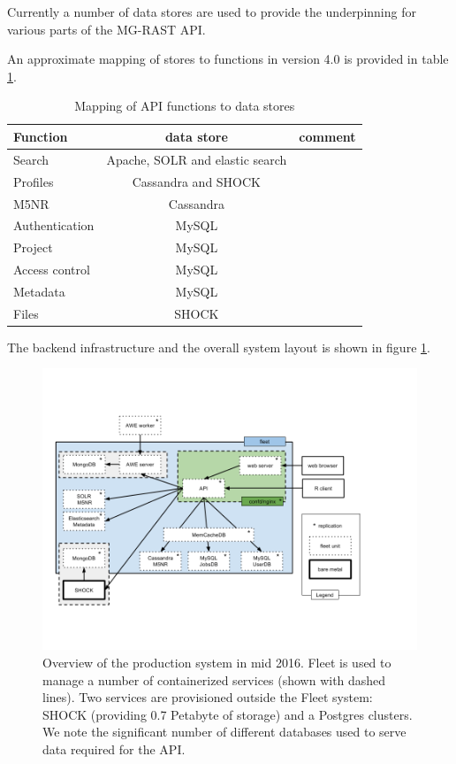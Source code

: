 \documentclass[12pt,fullpage]{report}
\begin{document}
Currently a number of data stores are used to provide the underpinning for various parts of the MG-RAST API.

An approximate mapping of stores to functions in version 4.0 is provided in table \ref{xtab:v4-stores-to-API}.

\begin{table}
\begin{center}
\begin{tabular}{ l | c | c }
Function & data store  & comment\\
  \hline
Search  & Apache, SOLR and elastic search & \\
Profiles & Cassandra and SHOCK & \\
M5NR   & Cassandra & \\
Authentication & MySQL \\
Project             & MySQL  & \\
Access control & MySQL &\\
Metadata         & MySQL & \\
Files                & SHOCK & \\
  \hline
\end{tabular}
\caption{Mapping of API functions to data stores}
\label{xtab:v4-stores-to-API}
\end{center}
\end{table}


The backend infrastructure and the overall system layout is shown in figure \ref{fig:2016-production}.

\begin{figure}
\begin{center}
\includegraphics[width=6in]{Images/2016-production-overview.png}
\end{center}
\caption{
Overview of the production system in mid 2016. Fleet is used to manage a number of containerized services (shown with dashed lines). Two services are provisioned outside the Fleet system: SHOCK (providing 0.7 Petabyte of storage) and a Postgres clusters. We note the significant number of different databases used to serve data required for the API.}
\label{fig:2016-production}
\end{figure}
\end{document}
